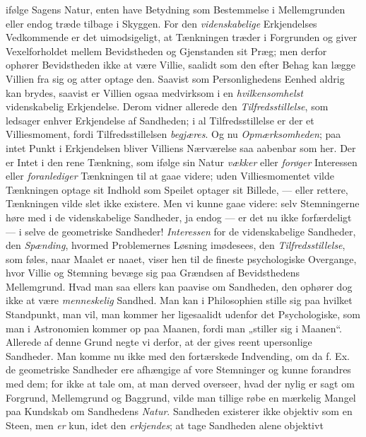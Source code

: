 \documentclass[12pt,a4paper]{book}
\newcommand{\opage}[1]{\marginnote{\footnotesize\textit{[#1]}}}
\begin{document}
ifølge Sagens Natur, enten have Betydning som Bestemmelse
i Mellemgrunden eller endog træde tilbage i
Skyggen. For den \emph{videnskabelige} Erkjendelses Vedkommende
er det uimodsigeligt, at Tænkningen træder i
Forgrunden og giver Vexelforholdet mellem Bevidstheden
og Gjenstanden sit Præg; men derfor ophører Bevidstheden
ikke at være Villie, saalidt som den efter Behag kan
lægge Villien fra sig og atter optage den. Saavist som
Personlighedens Eenhed aldrig kan brydes, saavist er Villien
ogsaa medvirksom i en \emph{hvilkensomhelst} videnskabelig
Erkjendelse. Derom vidner allerede den \emph{Tilfredsstillelse},
som ledsager enhver Erkjendelse af Sandheden; i
al Tilfredsstillelse er der et Villiesmoment, fordi Tilfredsstillelsen
\emph{begjæres}. Og nu \emph{Opmærksomheden};
paa intet Punkt i Erkjendelsen bliver Villiens Nærværelse
saa aabenbar som her. Der er Intet i den rene
Tænkning, som ifølge sin Natur \emph{vækker} eller \emph{forøger}
Interessen eller \emph{foranlediger} Tænkningen til at gaae
videre; uden Villiesmomentet vilde Tænkningen optage
sit Indhold som Speilet optager sit Billede, --- eller
\opage{23}\setcounter{footnote}{0}%
rettere, Tænkningen vilde slet ikke existere. Men vi kunne
gaae videre: selv Stemningerne høre med i de videnskabelige
Sandheder, ja endog --- er det nu ikke forfærdeligt
--- i selve de geometriske Sandheder! \emph{Interessen}
for de videnskabelige Sandheder, den \emph{Spænding}, hvormed
Problemernes Løsning imødesees, den \emph{Tilfredsstillelse},
som føles, naar Maalet er naaet, viser hen
til de fineste psychologiske Overgange, hvor Villie og Stemning
bevæge sig paa Grændsen af Bevidsthedens Mellemgrund.
Hvad man saa ellers kan paavise om Sandheden,
den ophører dog ikke at være \emph{menneskelig}
Sandhed. Man kan i Philosophien stille sig paa hvilket
Standpunkt, man vil, man kommer her ligesaalidt udenfor
det Psychologiske, som man i Astronomien kommer
op paa Maanen, fordi man „stiller sig i Maanen“.
Allerede af denne Grund negte vi derfor, at der gives
reent upersonlige Sandheder. Man komme nu ikke med
den fortærskede Indvending, om da f. Ex. de geometriske
Sandheder ere afhængige af vore Stemninger og kunne
forandres med dem; for ikke at tale om, at man derved
overseer, hvad der nylig er sagt om Forgrund, Mellemgrund
og Baggrund, vilde man tillige røbe en mærkelig
Mangel paa Kundskab om Sandhedens \emph{Natur}. Sandheden
existerer ikke objektiv som en Steen, men \emph{er} kun,
idet den \emph{erkjendes}; at tage Sandheden alene objektivt
\end{document}
